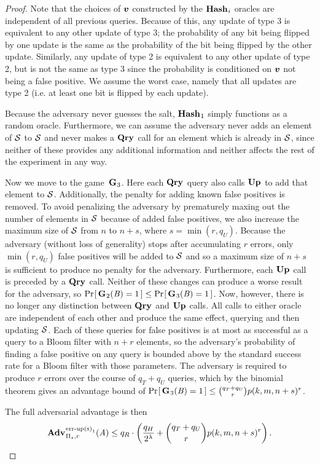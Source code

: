 \begin{proof}
Note that the choices of $\vv$ constructed by the $\mathbf{Hash}\hspace{0.5pt}_i$ oracles are independent of all previous queries. Because of this, any update of type 3 is equivalent to any other update of type 3; the probability of any bit being flipped by one update is the same as the probability of the bit being flipped by the other update. Similarly, any update of type 2 is equivalent to any other update of type 2, but is not the same as type 3 since the probability is conditioned on $\vv$ not being a false positive. We assume the worst case, namely that all updates are type 2 (i.e. at least one bit is flipped by each update).

Because the adversary never guesses the salt, $\mathbf{Hash}\hspace{0.5pt}_1$ simply functions as a random oracle. Furthermore, we can assume the adversary never adds an element of $\mathcal{S}$ to $\mathcal{S}$ and never makes a $\mathbf{Qry}\hspace{0.5pt}$ call for an element which is already in $\mathcal{S}$, since neither of these provides any additional information and neither affects the rest of the experiment in any way.

Now we move to the game~$\mathbf{G}\hspace{0.5pt}_3$. Here each $\mathbf{Qry}\hspace{0.5pt}$ query also calls $\mathbf{Up}\hspace{0.5pt}$ to add that element to $\mathcal{S}$. Additionally, the penalty for adding known false positives is removed. To avoid penalizing the adversary by prematurely maxing out the number of elements in $\mathcal{S}$ because of added false positives, we also increase the maximum size of $\mathcal{S}$ from $n$ to $n+s$, where $s = \min(r,q_U)$. Because the adversary (without loss of generality) stops after accumulating $r$ errors, only $\min(r,q_U)$ false positives will be added to $\mathcal{S}$ and so a maximum size of $n+s$ is sufficient to produce no penalty for the adversary. Furthermore, each $\mathbf{Up}\hspace{0.5pt}$ call is preceded by a $\mathbf{Qry}\hspace{0.5pt}$ call. Neither of these changes can produce a worse result for the adversary, so $\Pr\hspace{-1pt}\left[\,\mathbf{G}\hspace{0.5pt}_2(\mathit{B}) = 1\,\right] \le \Pr\hspace{-1pt}\left[\,\mathbf{G}\hspace{0.5pt}_3(\mathit{B}) = 1\,\right]$. Now, however, there is no longer any distinction between $\mathbf{Qry}\hspace{0.5pt}$ and $\mathbf{Up}\hspace{0.5pt}$ calls. All calls to either oracle are independent of each other and produce the same effect, querying and then updating $\mathcal{S}$. Each of these queries for false positives is at most as successful as a query to a Bloom filter with $n+r$ elements, so the adversary's probability of finding a false positive on any query is bounded above by the standard success rate for a Bloom filter with those parameters. The adversary is required to produce $r$ errors over the course of $q_T+q_U$ queries, which by the binomial theorem gives an advantage bound of $\Pr\hspace{-1pt}\left[\,\mathbf{G}\hspace{0.5pt}_3(\mathit{B}) = 1\,\right] \le \binom{q_T+q_U}{r}p(k, m, n+s)^r$.

The full adversarial advantage is then
$$\Adv{\erreps_1}_{\struct_s,r}(\advA) \le q_R \cdot \left(\frac{q_H}{2^\lambda} + \binom{q_T+q_U}{r}p(k, m, n+s)^r\right).$$
\missingqed
\end{proof}

